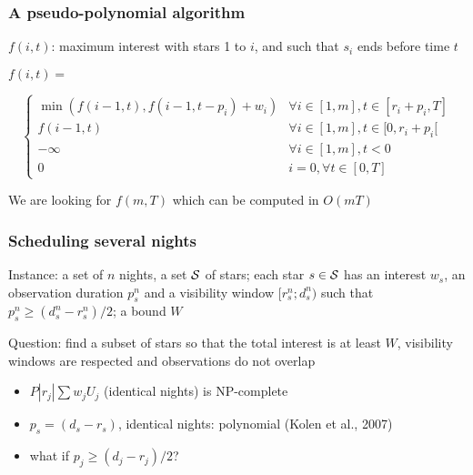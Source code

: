 \documentclass{beamer}
\begin{document}
\begin{frame}
  \frametitle{A pseudo-polynomial algorithm}
  
  $f(i,t)$: maximum interest with stars 1 to $i$, and such that $s_i$
  ends before time $t$
  
  \vfill

  $f(i,t)=$\par\kern-5mm%
  \[\left\{
    \begin{array}{ll}
      \min( f(i-1,t), f(i-1,t - p_i) + w_i) & \forall i \in [1, m], t \in[r_i+p_i, T] \\
      f(i-1,t) & \forall i \in [1, m], t \in [0, r_i+p_i[ \\
      
      -\infty& \forall i \in [1, m], t < 0\\
      0	& i = 0, \forall t \in[0, T] 
    \end{array}
  \right.\]
  \vfill
  
  We are looking for $f(m,T)$ which can be computed in $O(mT)$
\end{frame}


\begin{frame}
  \frametitle{Scheduling several nights}
  
  Instance: a set of $n$ nights, a set $\cal S$ of stars; each star
  $s\in\cal S$ has an interest $w_s$, an observation duration $p_s^n$
  and a visibility window $[r_s^n;d_s^n)$ \alert{such that $p_s^n\ge
    (d_s^n-r_s^n)/2$}; a bound $W$

  Question: find a subset of stars so that the total interest is at
  least $W$, visibility windows are respected and observations do not
  overlap

  \vfill

  \begin{itemize}
  \item<2-> $P|r_j|\sum w_jU_j$ (identical nights) is NP-complete
  \item<3-> $p_s = (d_s-r_s)$, identical nights: polynomial (Kolen et al., 2007)
  \item<4-> what if $p_j\ge (d_j-r_j)/2$?
  \end{itemize}

  \vfill
  
\end{frame}
\end{document}
